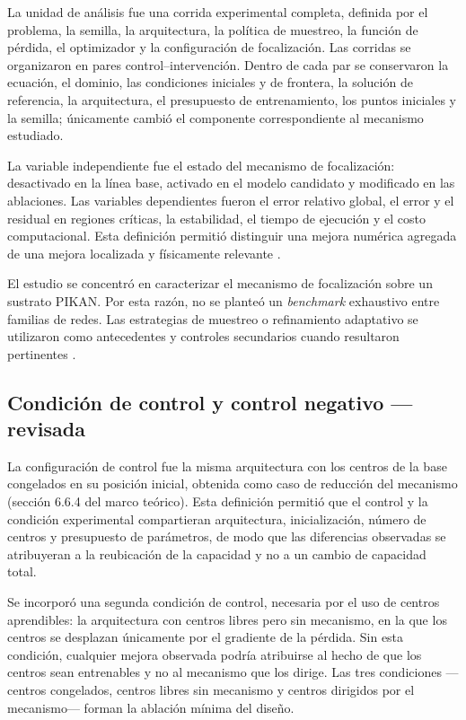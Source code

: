 La unidad de análisis fue una corrida experimental completa, definida por el problema, la semilla, la arquitectura, la política de muestreo, la función de pérdida, el optimizador y la configuración de focalización. Las corridas se organizaron en pares control–intervención. Dentro de cada par se conservaron la ecuación, el dominio, las condiciones iniciales y de frontera, la solución de referencia, la arquitectura, el presupuesto de entrenamiento, los puntos iniciales y la semilla; únicamente cambió el componente correspondiente al mecanismo estudiado.

La variable independiente fue el estado del mecanismo de focalización: desactivado en la línea base, activado en el modelo candidato y modificado en las ablaciones. Las variables dependientes fueron el error relativo global, el error y el residual en regiones críticas, la estabilidad, el tiempo de ejecución y el costo computacional. Esta definición permitió distinguir una mejora numérica agregada de una mejora localizada y físicamente relevante \cite{grossmann2024,krishnapriyan2021,shukla2024fair}.

El estudio se concentró en caracterizar el mecanismo de focalización sobre un sustrato PIKAN. Por esta razón, no se planteó un \textit{benchmark} exhaustivo entre familias de redes. Las estrategias de muestreo o refinamiento adaptativo se utilizaron como antecedentes y controles secundarios cuando resultaron pertinentes \cite{lu2021deepxde,wu2023sampling,kharazmi2021hpvpinns}.

\subsection{Condición de control y control negativo — revisada}

La configuración de control fue la misma arquitectura con los centros de la base congelados en su posición inicial, obtenida como caso de reducción del mecanismo (sección 6.6.4 del marco teórico). Esta definición permitió que el control y la condición experimental compartieran arquitectura, inicialización, número de centros y presupuesto de parámetros, de modo que las diferencias observadas se atribuyeran a la reubicación de la capacidad y no a un cambio de capacidad total.

Se incorporó una segunda condición de control, necesaria por el uso de centros aprendibles: la arquitectura con centros libres pero sin mecanismo, en la que los centros se desplazan únicamente por el gradiente de la pérdida. Sin esta condición, cualquier mejora observada podría atribuirse al hecho de que los centros sean entrenables y no al mecanismo que los dirige. Las tres condiciones —centros congelados, centros libres sin mecanismo y centros dirigidos por el mecanismo— forman la ablación mínima del diseño.

